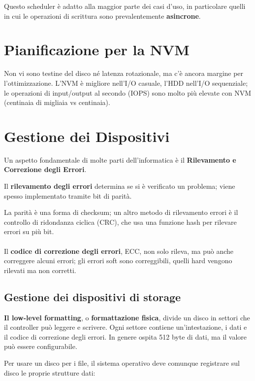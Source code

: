 Questo scheduler è adatto alla maggior parte dei casi d'uso, in particolare quelli in cui le
operazioni di scrittura sono prevalentemente \textbf{asincrone}.


\section{Pianificazione per la NVM}
Non vi sono testine del disco né latenza rotazionale, ma c'è ancora margine per l'ottimizzazione. L'NVM è migliore nell'I/O casuale, l'HDD nell'I/O sequenziale; le operazioni di input/output al secondo (IOPS) sono molto più elevate con NVM (centinaia di migliaia vs centinaia).


\section{Gestione dei Dispositivi}

Un aspetto fondamentale di molte parti dell'informatica è il \textbf{Rilevamento e Correzione degli Errori}. 

Il \textbf{rilevamento degli errori} determina se si è verificato un problema; viene spesso implementato tramite bit di parità. 

La parità è una forma di checksum; un altro metodo di rilevamento errori è il controllo di ridondanza ciclica (CRC), che usa una funzione hash per rilevare errori su più bit.

\paragraph{}

Il \textbf{codice di correzione degli errori}, ECC, non solo rileva, ma può anche correggere alcuni errori; gli errori soft sono correggibili, quelli hard vengono rilevati ma non corretti.


\subsection{Gestione dei dispositivi di storage}

\textbf{Il low-level formatting}, o \textbf{formattazione fisica}, divide un disco in settori che il controller può leggere e scrivere. Ogni settore contiene un'intestazione, i dati e il codice di correzione degli errori. In genere ospita 512 byte di dati, ma il valore può essere configurabile.

Per usare un disco per i file, il sistema operativo deve comunque registrare sul disco le proprie strutture dati:

